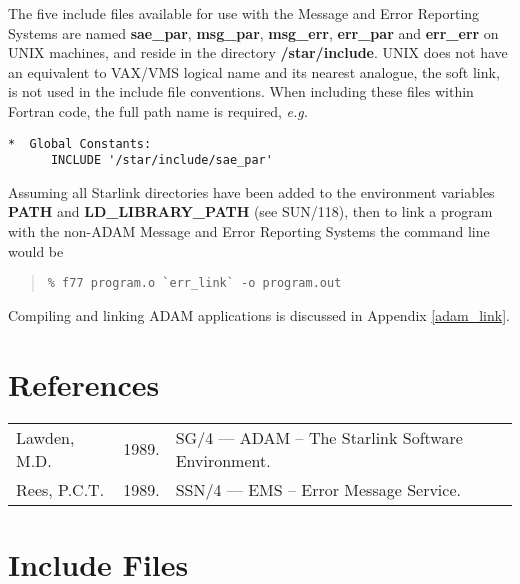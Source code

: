 The five include files available for use with the Message and Error Reporting
Systems are named {\bf sae\_par}, {\bf msg\_par}, {\bf msg\_err}, 
{\bf err\_par} and {\bf err\_err} on UNIX machines, and reside in the 
directory {\bf /star/include}.
UNIX does not have an equivalent to VAX/VMS logical name and its nearest
analogue, the soft link, is not used in the include file conventions.
When including these files within Fortran code, the full path name is required,
{\em e.g.}

\begin {small}
\begin{verbatim}
*  Global Constants:
      INCLUDE '/star/include/sae_par'
\end{verbatim}
\end {small}

\begin {sloppypar}
Assuming all Starlink directories have been added to the environment variables
{\bf PATH} and {\bf LD\_LIBRARY\_PATH} (see SUN/118), then to link a program
with the non-ADAM Message and Error Reporting Systems the command line would be
\end {sloppypar}

\begin {quote}
\begin {small}
\begin{verbatim}
% f77 program.o `err_link` -o program.out
\end{verbatim}
\end {small}
\end {quote}

Compiling and linking ADAM applications is discussed in Appendix
\ref{adam_link}.


\section {References}

\begin {trivlist} \item[]
\begin {tabular}{lll}
Lawden, M.D. & 1989. & SG/4 --- ADAM -- The Starlink Software Environment.\\
Rees, P.C.T. & 1989. & SSN/4 --- EMS -- Error Message Service.\\
\end {tabular}
\end {trivlist}

\newpage\appendix
\section {Include Files} \label{incl_sect}

